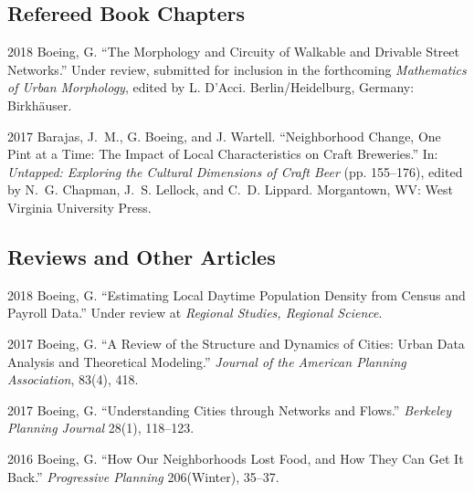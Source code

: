 \documentclass{academiccv}
\begin{document}
\subsection*{Refereed Book Chapters}

\begin{tablist}

\item[2018] \tab Boeing, G. \enquote{The Morphology and Circuity of Walkable and Drivable Street Networks.} Under review, submitted for inclusion in the forthcoming \emph{Mathematics of Urban Morphology}, edited by L. D'Acci. Berlin/Heidelburg, Germany: Birkh{\"a}user.

\item[2017] \tab Barajas, J.~M., G. Boeing, and J. Wartell. \enquote{Neighborhood Change, One Pint at a Time: The Impact of Local Characteristics on Craft Breweries.} In: \emph{Untapped: Exploring the Cultural Dimensions of Craft Beer} (pp. 155--176), edited by N.~G. Chapman, J.~S. Lellock, and C.~D. Lippard. Morgantown, WV: West Virginia University Press.

\end{tablist}



\subsection*{Reviews and Other Articles}

\begin{tablist}
	
\item[2018] \tab Boeing, G. \enquote{Estimating Local Daytime Population Density from Census and Payroll Data.} Under review at \emph{Regional Studies, Regional Science}.
	
\item[2017] \tab Boeing, G. \enquote{A Review of the Structure and Dynamics of Cities: Urban Data Analysis and Theoretical Modeling.} \emph{Journal of the American Planning Association}, 83(4), 418.
	
\item[2017] \tab Boeing, G. \enquote{Understanding Cities through Networks and Flows.} \emph{Berkeley Planning Journal} 28(1), 118--123.

\item[2016] \tab Boeing, G. \enquote{How Our Neighborhoods Lost Food, and How They Can Get It Back.} \emph{Progressive Planning} 206(Winter), 35--37.
	
\end{tablist}
\end{document}
